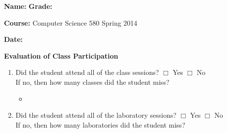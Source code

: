 \documentclass[letterpaper, 10pt]{article} %
\begin{document}
\pagestyle{empty}

\vspace*{-1in}

\noindent
{\bf Name:} \hspace*{4.8in} {\bf Grade:} 

\vspace*{.1in}

\noindent
{\bf Course:} Computer Science 580 Spring 2014

\vspace*{.1in}

\noindent
{\bf Date:} 

\vspace*{.1in}

\large{

\begin{center}{\bf Evaluation of Class Participation} \end{center}

\begin{enumerate}

\item Did the student attend all of the class
  sessions? \hspace*{.05in} $\Box$ Yes
  \hspace*{.05in} $\Box$ No \hspace*{.05in} \\ If no, then how many
  classes did the student miss? \vspace*{-.1in}

\begin{itemize}
\renewcommand{\labelitemi}{$\blacktriangleright$}

\setlength{\itemsep}{1pt}

\item \underline{\hspace*{.75in}}

\end{itemize} \vspace*{-.05in}

\item Did the student attend all of the laboratory
  sessions? \hspace*{.05in} $\Box$ Yes
  \hspace*{.05in} $\Box$ No \hspace*{.05in} \\ If no, then how many
  laboratories did the student miss? \vspace*{-.1in}

\begin{itemize}
\renewcommand{\labelitemi}{$\blacktriangleright$}


\end{itemize}
\end{enumerate}}
\end{document}
